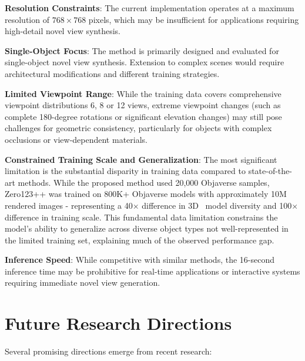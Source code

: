 \textbf{Resolution Constraints}: The current implementation operates at a maximum resolution of $768 \times 768$ pixels, which may be insufficient for applications requiring high-detail novel view synthesis.

\textbf{Single-Object Focus}: The method is primarily designed and evaluated for single-object novel view synthesis. Extension to complex scenes would require architectural modifications and different training strategies.

\textbf{Limited Viewpoint Range}: While the training data covers comprehensive viewpoint distributions 6, 8 or 12 views, extreme viewpoint changes (such as complete 180-degree rotations or significant elevation changes) may still pose challenges for geometric consistency, particularly for objects with complex occlusions or view-dependent materials.

\textbf{Constrained Training Scale and Generalization}: The most significant limitation is the substantial disparity in training data compared to state-of-the-art methods. While the proposed method used 20,000 Objaverse samples, Zero123++ was trained on 800K+ Objaverse models with approximately 10M rendered images - representing a 40$\times$ difference in 3D  model diversity and 100$\times$ difference in training scale. This fundamental data limitation constrains the model's ability to generalize across diverse object types not well-represented in the limited training set, explaining much of the observed performance gap.

\textbf{Inference Speed}: While competitive with similar methods, the 16-second inference time may be prohibitive for real-time applications or interactive systems requiring immediate novel view generation.

\section{Future Research Directions}

Several promising directions emerge from recent research:

